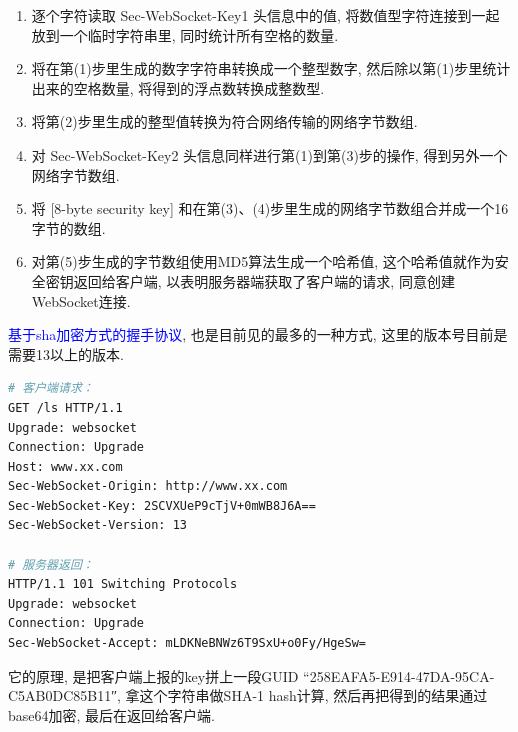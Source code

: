 {    \begin{enumerate}
        \item{逐个字符读取 Sec-WebSocket-Key1 头信息中的值, 将数值型字符连接到一起放到一个临时字符串里, 同时统计所有空格的数量.}\par
        \item{将在第(1)步里生成的数字字符串转换成一个整型数字, 然后除以第(1)步里统计出来的空格数量, 将得到的浮点数转换成整数型.}\par
        \item{将第(2)步里生成的整型值转换为符合网络传输的网络字节数组.}\par
        \item{对 Sec-WebSocket-Key2 头信息同样进行第(1)到第(3)步的操作, 得到另外一个网络字节数组.}\par
        \item{将 [8-byte security key] 和在第(3)、(4)步里生成的网络字节数组合并成一个16字节的数组. }\par
        \item{对第(5)步生成的字节数组使用MD5算法生成一个哈希值, 这个哈希值就作为安全密钥返回给客户端, 以表明服务器端获取了客户端的请求, 同意创建WebSocket连接. }\par
    \end{enumerate}

    {\textcolor{blue}{基于sha加密方式的握手协议},  也是目前见的最多的一种方式, 这里的版本号目前是需要13以上的版本.}\par

\begin{lstlisting}[language=bash]
# 客户端请求：
GET /ls HTTP/1.1
Upgrade: websocket
Connection: Upgrade
Host: www.xx.com
Sec-WebSocket-Origin: http://www.xx.com
Sec-WebSocket-Key: 2SCVXUeP9cTjV+0mWB8J6A==
Sec-WebSocket-Version: 13

# 服务器返回：
HTTP/1.1 101 Switching Protocols
Upgrade: websocket
Connection: Upgrade
Sec-WebSocket-Accept: mLDKNeBNWz6T9SxU+o0Fy/HgeSw=
\end{lstlisting}

    {它的原理, 是把客户端上报的key拼上一段GUID “258EAFA5-E914-47DA-95CA-C5AB0DC85B11″, 拿这个字符串做SHA-1 hash计算, 然后再把得到的结果通过base64加密, 最后在返回给客户端.}\par
}

